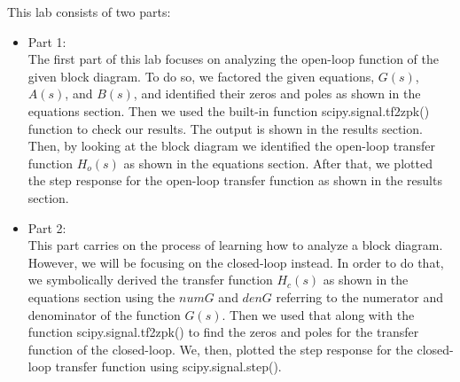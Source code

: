 \documentclass[12pt]{report}
\begin{document}
This lab consists of two parts:
\begin{itemize}
    \item
    Part 1:\\
    The first part of this lab focuses on analyzing the open-loop function of the given block diagram. To do so, we factored the given equations, $G(s)$, $A(s)$, and $B(s)$, and identified their zeros and poles as shown in the equations section. Then we used the built-in function scipy.signal.tf2zpk() function to check our results. The output is shown in the results section. Then, by looking at the block diagram we identified the open-loop transfer function $H_o(s)$ as shown in the equations section. After that, we plotted the step response for the open-loop transfer function as shown in the results section.

    \item
    Part 2:\\
    This part carries on the process of learning how to analyze a block diagram. However, we will be focusing on the closed-loop instead. In order to do that, we symbolically derived the transfer function $H_c(s)$ as shown in the equations section using the $numG$ and $denG$ referring to the numerator and denominator of the function $G(s)$. Then we used that along with the function scipy.signal.tf2zpk() to find the zeros and poles for the transfer function of the closed-loop. We, then, plotted the step response for the closed-loop transfer function using scipy.signal.step().

\end{itemize}
   
\end{document}
